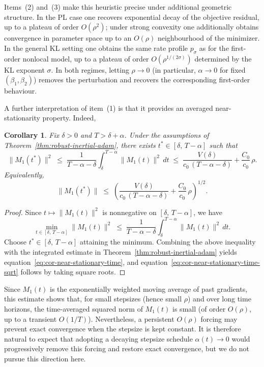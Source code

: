 \documentclass{article} %
\def\eqref#1{equation~\ref{#1}}
\newtheorem{corollary}{Corollary}
\begin{document}
Items~(2) and~(3) make this heuristic precise under additional geometric structure. In the PL case one recovers exponential decay of the objective residual, up to a plateau of order $O(\rho^2)$; under strong convexity one additionally obtains convergence in parameter space up to an $O(\rho)$ neighbourhood of the minimizer. In the general KL setting one obtains the same rate profile $p_\sigma$ as for the first-order nonlocal model, up to a plateau of order $O(\rho^{1/(2\sigma)})$ determined by the KL exponent $\sigma$. In both regimes, letting $\rho\to 0$ (in particular, $\alpha\to 0$ for fixed $(\beta_1,\beta_2)$) removes the perturbation and recovers the corresponding first-order behaviour.

A further interpretation of item~(1) is that it provides an averaged near-stationarity property. Indeed,
\begin{corollary}
Fix $\delta>0$ and $T>\delta+\alpha$. Under the assumptions of Theorem~\ref{thm:robust-inertial-adam}, there exists $t^*\in[\delta,\,T-\alpha]$ such that
\begin{equation}\label{eq:cor-near-stationary-time}
\|M_1(t^*)\|^2 \;\le\; \frac{1}{T-\alpha-\delta}\int_{\delta}^{T-\alpha}\|M_1(t)\|^2\,dt
\;\le\; \frac{V(\delta)}{c_0\,(T-\alpha-\delta)}+\frac{C_0}{c_0}\,\rho.
\end{equation}
Equivalently,
\begin{equation}\label{eq:cor-near-stationary-time-sqrt}
\|M_1(t^*)\|\;\le\;\left(\frac{V(\delta)}{c_0\,(T-\alpha-\delta)}+\frac{C_0}{c_0}\,\rho\right)^{1/2}.
\end{equation}
\end{corollary}

\begin{proof}
Since $t\mapsto \|M_1(t)\|^2$ is nonnegative on $[\delta,\,T-\alpha]$, we have
\[
\min_{t\in[\delta,\,T-\alpha]}\|M_1(t)\|^2 \;\le\; \frac{1}{T-\alpha-\delta}\int_{\delta}^{T-\alpha}\|M_1(t)\|^2\,dt.
\]
Choose $t^*\in[\delta,\,T-\alpha]$ attaining the minimum. Combining the above inequality with the integrated estimate in Theorem~\ref{thm:robust-inertial-adam} yields \eqref{eq:cor-near-stationary-time}, and \eqref{eq:cor-near-stationary-time-sqrt} follows by taking square roots.
\end{proof}

Since $M_1(t)$ is the exponentially weighted moving average of past gradients, this estimate shows that, for small stepsizes (hence small $\rho$) and over long time horizons, the time-averaged squared norm of $M_1(t)$ is small (of order $O(\rho)$, up to a transient $O(1/T)$). Nevertheless, a persistent $O(\rho)$ forcing may prevent exact convergence when the stepsize is kept constant. It is therefore natural to expect that adopting a decaying stepsize schedule $\alpha(t)\to 0$ would progressively remove this forcing and restore exact convergence, but we do not pursue this direction here.
\end{document}
